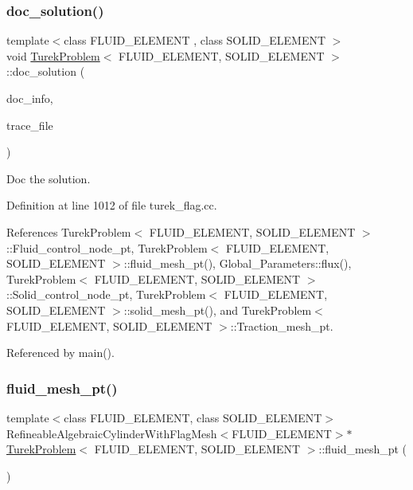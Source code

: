 \subsubsection{\texorpdfstring{doc\+\_\+solution()}{doc\_solution()}}
{\footnotesize\ttfamily template$<$class F\+L\+U\+I\+D\+\_\+\+E\+L\+E\+M\+E\+NT , class S\+O\+L\+I\+D\+\_\+\+E\+L\+E\+M\+E\+NT $>$ \\
void \hyperlink{classTurekProblem}{Turek\+Problem}$<$ F\+L\+U\+I\+D\+\_\+\+E\+L\+E\+M\+E\+NT, S\+O\+L\+I\+D\+\_\+\+E\+L\+E\+M\+E\+NT $>$\+::doc\+\_\+solution (\begin{DoxyParamCaption}\item[{Doc\+Info \&}]{doc\+\_\+info,  }\item[{ofstream \&}]{trace\+\_\+file }\end{DoxyParamCaption})}



Doc the solution. 



Definition at line 1012 of file turek\+\_\+flag.\+cc.



References Turek\+Problem$<$ F\+L\+U\+I\+D\+\_\+\+E\+L\+E\+M\+E\+N\+T, S\+O\+L\+I\+D\+\_\+\+E\+L\+E\+M\+E\+N\+T $>$\+::\+Fluid\+\_\+control\+\_\+node\+\_\+pt, Turek\+Problem$<$ F\+L\+U\+I\+D\+\_\+\+E\+L\+E\+M\+E\+N\+T, S\+O\+L\+I\+D\+\_\+\+E\+L\+E\+M\+E\+N\+T $>$\+::fluid\+\_\+mesh\+\_\+pt(), Global\+\_\+\+Parameters\+::flux(), Turek\+Problem$<$ F\+L\+U\+I\+D\+\_\+\+E\+L\+E\+M\+E\+N\+T, S\+O\+L\+I\+D\+\_\+\+E\+L\+E\+M\+E\+N\+T $>$\+::\+Solid\+\_\+control\+\_\+node\+\_\+pt, Turek\+Problem$<$ F\+L\+U\+I\+D\+\_\+\+E\+L\+E\+M\+E\+N\+T, S\+O\+L\+I\+D\+\_\+\+E\+L\+E\+M\+E\+N\+T $>$\+::solid\+\_\+mesh\+\_\+pt(), and Turek\+Problem$<$ F\+L\+U\+I\+D\+\_\+\+E\+L\+E\+M\+E\+N\+T, S\+O\+L\+I\+D\+\_\+\+E\+L\+E\+M\+E\+N\+T $>$\+::\+Traction\+\_\+mesh\+\_\+pt.



Referenced by main().

\mbox{\label{classTurekProblem_a0fc23b86efec256cb7f4450a928f7999}} 
\subsubsection{\texorpdfstring{fluid\+\_\+mesh\+\_\+pt()}{fluid\_mesh\_pt()}}
{\footnotesize\ttfamily template$<$class F\+L\+U\+I\+D\+\_\+\+E\+L\+E\+M\+E\+NT, class S\+O\+L\+I\+D\+\_\+\+E\+L\+E\+M\+E\+NT$>$ \\
Refineable\+Algebraic\+Cylinder\+With\+Flag\+Mesh$<$F\+L\+U\+I\+D\+\_\+\+E\+L\+E\+M\+E\+NT$>$$\ast$ \hyperlink{classTurekProblem}{Turek\+Problem}$<$ F\+L\+U\+I\+D\+\_\+\+E\+L\+E\+M\+E\+NT, S\+O\+L\+I\+D\+\_\+\+E\+L\+E\+M\+E\+NT $>$\+::fluid\+\_\+mesh\+\_\+pt (\begin{DoxyParamCaption}{ }\end{DoxyParamCaption})\hspace{0.3cm}{\ttfamily [inline]}}



